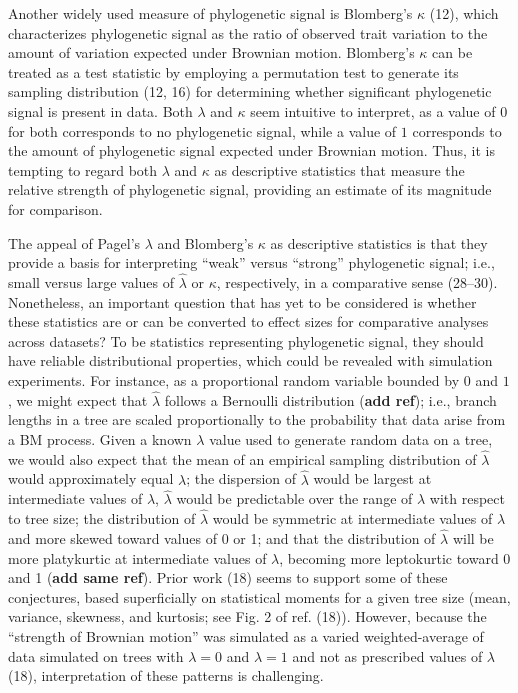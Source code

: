 \documentclass[9pt,twocolumn,twoside,lineno]{pnas-new}
\begin{document}
Another widely used measure of phylogenetic signal is Blomberg's
\(\kappa\) (12), which characterizes phylogenetic signal as the ratio of
observed trait variation to the amount of variation expected under
Brownian motion. Blomberg's \(\kappa\) can be treated as a test
statistic by employing a permutation test to generate its sampling
distribution (12, 16) for determining whether significant phylogenetic
signal is present in data. Both \(\lambda\) and \(\kappa\) seem
intuitive to interpret, as a value of \(0\) for both corresponds to no
phylogenetic signal, while a value of \(1\) corresponds to the amount of
phylogenetic signal expected under Brownian motion. Thus, it is tempting
to regard both \(\lambda\) and \(\kappa\) as descriptive statistics that
measure the relative strength of phylogenetic signal, providing an
estimate of its magnitude for comparison.

The appeal of Pagel's \(\lambda\) and Blomberg's \(\kappa\) as
descriptive statistics is that they provide a basis for interpreting
``weak'' versus ``strong'' phylogenetic signal; i.e., small versus large
values of \(\hat{\lambda}\) or \(\kappa\), respectively, in a
comparative sense (28--30). Nonetheless, an important question that has
yet to be considered is whether these statistics are or can be converted
to effect sizes for comparative analyses across datasets? To be
statistics representing phylogenetic signal, they should have reliable
distributional properties, which could be revealed with simulation
experiments. For instance, as a proportional random variable bounded by
\(0\) and \(1\), we might expect that \(\hat{\lambda}\) follows a
Bernoulli distribution (\textbf{add ref}); i.e., branch lengths in a
tree are scaled proportionally to the probability that data arise from a
BM process. Given a known \(\lambda\) value used to generate random data
on a tree, we would also expect that the mean of an empirical sampling
distribution of \(\hat{\lambda}\) would approximately equal \(\lambda\);
the dispersion of \(\hat{\lambda}\) would be largest at intermediate
values of \(\lambda\), \(\hat{\lambda}\) would be predictable over the
range of \(\lambda\) with respect to tree size; the distribution of
\(\hat{\lambda}\) would be symmetric at intermediate values of
\(\lambda\) and more skewed toward values of 0 or 1; and that the
distribution of \(\hat{\lambda}\) will be more platykurtic at
intermediate values of \(\lambda\), becoming more leptokurtic toward 0
and 1 (\textbf{add same ref}). Prior work (18) seems to support some of
these conjectures, based superficially on statistical moments for a
given tree size (mean, variance, skewness, and kurtosis; see Fig. 2 of
ref. (18)). However, because the ``strength of Brownian motion'' was
simulated as a varied weighted-average of data simulated on trees with
\(\lambda=0\) and \(\lambda=1\) and not as prescribed values of
\(\lambda\) (18), interpretation of these patterns is challenging.
\end{document}
